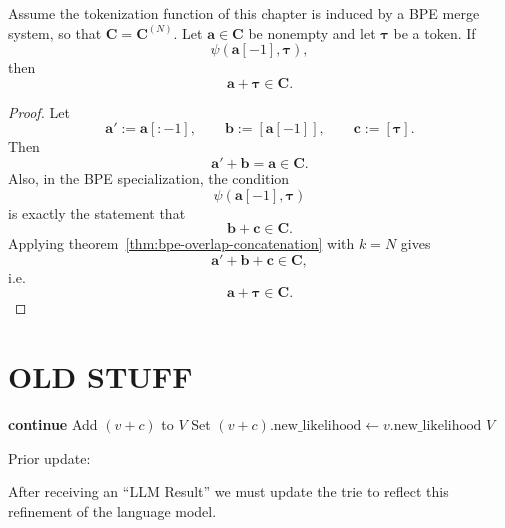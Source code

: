 \begin{corollary}
    \label{cor:bpe-last-pair-extension}
    Assume the tokenization function of this chapter is induced by a BPE merge system, so that
    $\mathbf{C} = \mathbf{C}^{(N)}$.
    Let $\mathbf{a} \in \mathbf{C}$ be nonempty and let $\boldsymbol{\tau}$ be a token.
    If
    \[
    \psi(\mathbf{a}[-1], \boldsymbol{\tau}),
    \]
    then
    \[
    \mathbf{a}+\boldsymbol{\tau} \in \mathbf{C}.
    \]
\end{corollary}
\begin{proof}
    Let
    \[
    \mathbf{a}' := \mathbf{a}[:-1],
    \qquad
    \mathbf{b} := [\mathbf{a}[-1]],
    \qquad
    \mathbf{c} := [\boldsymbol{\tau}].
    \]
    Then
    \[
    \mathbf{a}'+\mathbf{b} = \mathbf{a} \in \mathbf{C}.
    \]
    Also, in the BPE specialization, the condition
    \[
    \psi(\mathbf{a}[-1], \boldsymbol{\tau})
    \]
    is exactly the statement that
    \[
    \mathbf{b}+\mathbf{c} \in \mathbf{C}.
    \]
    Applying theorem~\ref{thm:bpe-overlap-concatenation} with $k=N$ gives
    \[
    \mathbf{a}'+\mathbf{b}+\mathbf{c} \in \mathbf{C},
    \]
    i.e.
    \[
    \mathbf{a}+\boldsymbol{\tau} \in \mathbf{C}.
    \]
\end{proof}

\section{OLD STUFF}
\begin{algorithm}[H]
\caption{Complete Visible Trie}
\label{alg:complete-visible-trie}
\begin{algorithmic}[1]
        \State \textbf{continue} 
    \EndIf
            \State Add $(v + c)$ to $V$
            \State Set $(v + c).\text{new\_likelihood} \gets v.\text{new\_likelihood}$
        \EndIf
    \EndFor
\EndFor
\Return $V$
\end{algorithmic}
\end{algorithm}




Prior update:
\label{sec:prior-update}

After receiving an ``LLM Result'' we must update the trie to reflect this refinement of
the language model.

